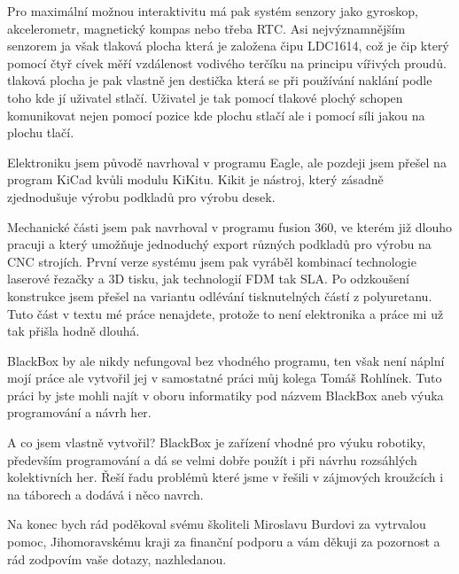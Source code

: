     Pro maximální možnou interaktivitu má pak systém senzory jako gyroskop, akcelerometr, magnetický kompas nebo 
    třeba RTC. Asi nejvýznamnějším senzorem ja však tlaková plocha která je založena čipu LDC1614, což je čip který 
    pomocí čtyř cívek měří vzdálenost vodivého terčíku na principu vířivých proudů. tlaková plocha je pak vlastně 
    jen destička která se při používání naklání podle toho kde jí uživatel stlačí. Uživatel je tak pomocí tlakové plochý
    schopen komunikovat nejen pomocí pozice kde plochu stlačí ale i pomocí síli jakou na plochu tlačí. 

    Elektroniku jsem původě navrhoval v programu Eagle, ale pozdeji jsem přešel na program KiCad kvůli modulu KiKitu. 
    Kikit je nástroj, který zásadně zjednodušuje výrobu podkladů pro výrobu desek. 
    
    Mechanické části jsem pak navrhoval v programu fusion 360, ve kterém již dlouho pracuji a který umožňuje jednoduchý 
    export různých podkladů pro výrobu na CNC strojích.
    První verze systému jsem pak vyráběl kombinací technologie laserové řezačky a 3D tisku, jak technologií FDM tak SLA.
    Po odzkoušení konstrukce jsem přešel na variantu odlévání tisknutelných částí z polyuretanu. 
    Tuto část v textu mé práce nenajdete, protože
    to není elektronika a práce mi už tak přišla hodně dlouhá.

    BlackBox by ale nikdy nefungoval bez vhodného programu, ten však není náplní mojí práce ale vytvořil jej v samostatné 
    práci můj kolega Tomáš Rohlínek. Tuto práci by jste mohli najít v oboru informatiky pod názvem 
    BlackBox aneb výuka programování a návrh her.

    A co jsem vlastně vytvořil? 
    BlackBox je zařízení vhodné pro výuku robotiky, především programování a dá se velmi dobře použít i při návrhu rozsáhlých 
    kolektivních her. Řeší řadu problémů které jsme v řešili v zájmových kroužcích i na táborech a dodává i něco navrch.

    Na konec bych rád poděkoval svému školiteli Miroslavu Burdovi za vytrvalou pomoc, Jihomoravskému kraji za finanční 
    podporu a vám děkuji za pozornost a rád zodpovím vaše dotazy, nazhledanou. 

